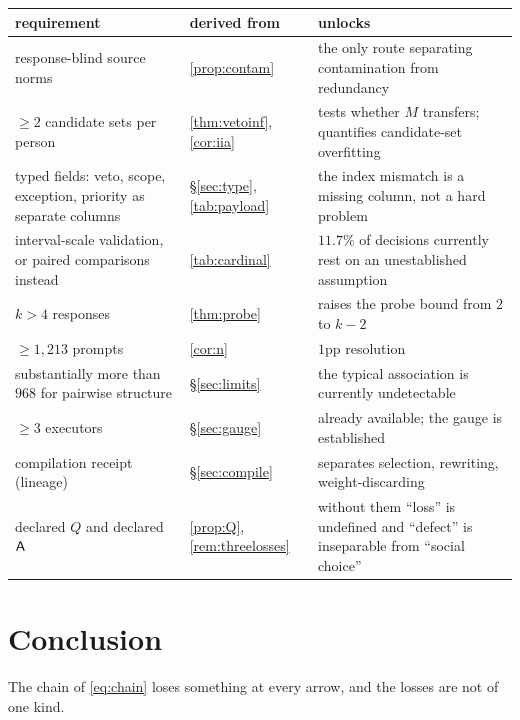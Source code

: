 \begin{table}[H]\centering\footnotesize
\begin{tabularx}{\textwidth}{P{4.6cm}P{3.4cm}Y}
\toprule
requirement & derived from & unlocks\\
\midrule
response-blind source norms & \cref{prop:contam} & the only route separating
contamination from redundancy\\
$\ge 2$ candidate sets per person & \cref{thm:vetoinf}, \cref{cor:iia} & tests
whether $M$ transfers; quantifies candidate-set overfitting\\
typed fields: veto, scope, exception, priority as separate columns &
§\ref{sec:type}, \cref{tab:payload} & the index mismatch is a missing column, not
a hard problem\\
interval-scale validation, or paired comparisons instead & \cref{tab:cardinal} &
$11.7\%$ of decisions currently rest on an unestablished assumption\\
$k>4$ responses & \cref{thm:probe} & raises the probe bound from $2$ to $k-2$\\
$\ge 1{,}213$ prompts & \cref{cor:n} & $1$pp resolution\\
substantially more than $968$ for pairwise structure & §\ref{sec:limits} &
the typical association is currently undetectable\\
$\ge 3$ executors & §\ref{sec:gauge} & already available; the gauge is established\\
compilation receipt (lineage) & §\ref{sec:compile} & separates selection,
rewriting, weight-discarding\\
declared $Q$ and declared $\mathsf{A}$ & \cref{prop:Q}, \cref{rem:threelosses} &
without them ``loss'' is undefined and ``defect'' is inseparable from ``social
choice''\\
\bottomrule
\end{tabularx}
\end{table}

\section{Conclusion}

The chain of \cref{eq:chain} loses something at every arrow, and the losses are
not of one kind.

